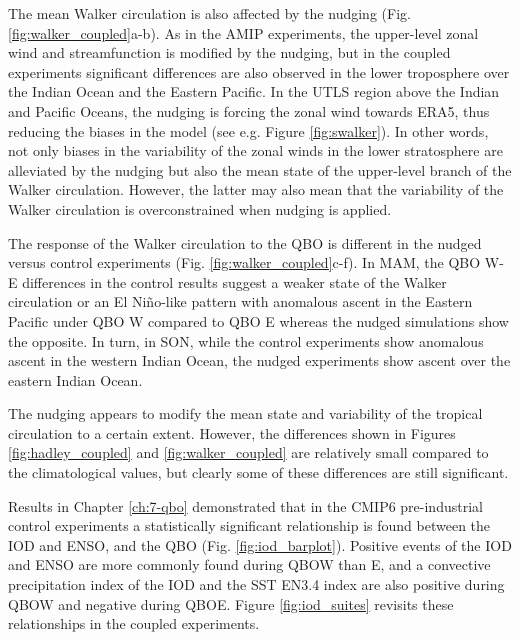 
The mean Walker circulation is also affected by the nudging (Fig. \ref{fig:walker_coupled}a-b). As in the AMIP experiments, the upper-level zonal wind and streamfunction is modified by the nudging, but in the coupled experiments significant differences are also observed in the lower troposphere over the Indian Ocean and the Eastern Pacific. 
In the UTLS region above the Indian and Pacific Oceans, the nudging is forcing the zonal wind towards ERA5, thus reducing the biases in the model (see e.g. Figure \ref{fig:swalker}). In other words, not only biases in the variability of the zonal winds in the lower stratosphere are alleviated by the nudging but also the mean state of the upper-level branch of the Walker circulation. However, the latter may also mean that the variability of the Walker circulation is overconstrained when nudging is applied. 

The response of the Walker circulation to the QBO is different in the nudged versus control experiments (Fig. \ref{fig:walker_coupled}c-f). In MAM, the QBO W-E differences in the control results suggest a weaker state of the Walker circulation or an El Niño-like pattern with anomalous ascent in the Eastern Pacific under QBO W compared to QBO E whereas the nudged simulations show the opposite. 
In turn, in SON, while the control experiments show anomalous ascent in the western Indian Ocean, the nudged experiments show ascent over the eastern Indian Ocean. 

The nudging appears to modify the mean state and variability of the tropical circulation to a certain extent. However, the differences shown in Figures \ref{fig:hadley_coupled} and \ref{fig:walker_coupled} are relatively small compared to the climatological values,  but clearly some of these differences are still significant. 

Results in Chapter \ref{ch:7-qbo} demonstrated that in the CMIP6 pre-industrial control experiments a statistically significant relationship is found between the IOD and ENSO, and the QBO (Fig. \ref{fig:iod_barplot}). 
Positive events of the IOD and ENSO are more commonly found during QBOW than E, and a convective precipitation index of the IOD and the SST EN3.4 index are also positive during QBOW and negative during QBOE. 
Figure \ref{fig:iod_suites} revisits these relationships in the coupled experiments. 


